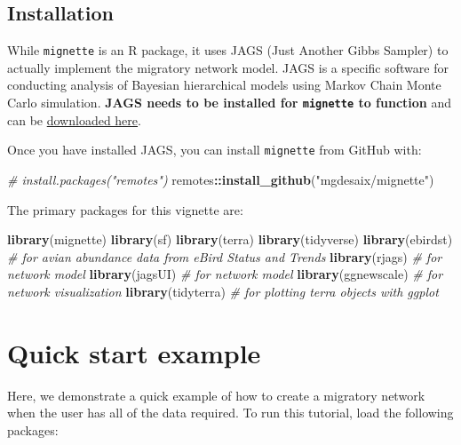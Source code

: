 \documentclass[
]{book}
\newenvironment{Shaded}{\begin{snugshade}}{\end{snugshade}}
\newcommand{\CommentTok}[1]{\textcolor[rgb]{0.56,0.35,0.01}{\textit{#1}}}
\newcommand{\FunctionTok}[1]{\textcolor[rgb]{0.13,0.29,0.53}{\textbf{#1}}}
\newcommand{\NormalTok}[1]{#1}
\newcommand{\SpecialCharTok}[1]{\textcolor[rgb]{0.81,0.36,0.00}{\textbf{#1}}}
\newcommand{\StringTok}[1]{\textcolor[rgb]{0.31,0.60,0.02}{#1}}
\begin{document}
\hypertarget{installation}{%
\section{Installation}\label{installation}}

While \texttt{mignette} is an R package, it uses JAGS (Just Another Gibbs Sampler) to actually implement the migratory network model. JAGS is a specific software for conducting analysis of Bayesian hierarchical models using Markov Chain Monte Carlo simulation. \textbf{JAGS needs to be installed for \texttt{mignette} to function} and can be \href{https://mcmc-jags.sourceforge.io/}{downloaded here}.

Once you have installed JAGS, you can install \texttt{mignette} from GitHub with:

\begin{Shaded}
\begin{Highlighting}[]
\CommentTok{\# install.packages("remotes")}
\NormalTok{remotes}\SpecialCharTok{::}\FunctionTok{install\_github}\NormalTok{(}\StringTok{"mgdesaix/mignette"}\NormalTok{)}
\end{Highlighting}
\end{Shaded}

The primary packages for this vignette are:

\begin{Shaded}
\begin{Highlighting}[]
\FunctionTok{library}\NormalTok{(mignette)}
\FunctionTok{library}\NormalTok{(sf)}
\FunctionTok{library}\NormalTok{(terra)}
\FunctionTok{library}\NormalTok{(tidyverse)}
\FunctionTok{library}\NormalTok{(ebirdst) }\CommentTok{\# for avian abundance data from eBird Status and Trends}
\FunctionTok{library}\NormalTok{(rjags) }\CommentTok{\# for network model}
\FunctionTok{library}\NormalTok{(jagsUI) }\CommentTok{\# for network model}
\FunctionTok{library}\NormalTok{(ggnewscale) }\CommentTok{\# for network visualization}
\FunctionTok{library}\NormalTok{(tidyterra) }\CommentTok{\# for plotting terra objects with ggplot}
\end{Highlighting}
\end{Shaded}

\hypertarget{quickstart}{%
\chapter{Quick start example}\label{quickstart}}

Here, we demonstrate a quick example of how to create a migratory network when the user has all of the data required. To run this tutorial, load the following packages:
\end{document}
